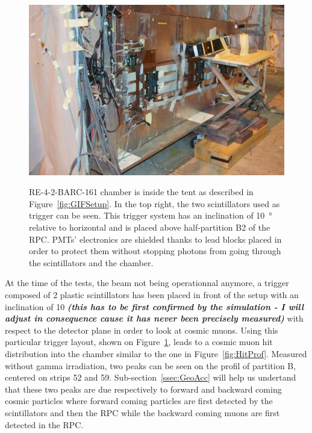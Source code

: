 		\begin{figure}[!h]
			\begin{center}
				\includegraphics[width = \plotwidth]{fig/Setup.jpg}\\
				\caption{\label{fig:RPCSetup} RE-4-2-BARC-161 chamber is inside the tent as described in Figure~\ref{fig:GIFSetup}. In the top right, the two scintillators used as trigger can be seen. This trigger system has an inclination of \SI{10}{\degree} relative to horizontal and is placed above half-partition B2 of the RPC. PMTs' electronics are shielded thanks to lead blocks placed in order to protect them without stopping photons from going through the scintillators and the chamber.}
			\end{center}
		\end{figure}
		
		At the time of the tests, the beam not being operationnal anymore, a trigger composed of 2 plastic scintillators has been placed in front of the setup with an inclination of \SI{10}{\deg} \textit{\textbf{(this has to be first confirmed by the simulation - I will adjust in consequence cause it has never been precisely measured)}} with respect to the detector plane in order to look at cosmic muons. Using this particular trigger layout, shown on Figure~\ref{fig:RPCSetup}, leads to a cosmic muon hit distribution into the chamber similar to the one in Figure~\ref{fig:HitProf}. Measured without gamma irradiation, two peaks can be seen on the profil of partition B, centered on strips 52 and 59. Sub-section~\ref{ssec:GeoAcc} will help us undertand that these two peaks are due respectively to forward and backward coming cosmic particles where forward coming particles are first detected by the scintillators and then the RPC while the backward coming muons are first detected in the RPC.

